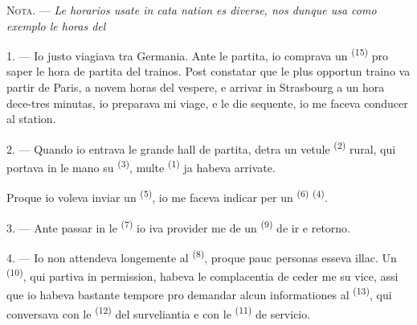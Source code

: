 
\VUsaut{4.0mm}
\VUsaut{2.4mm}
\VUsaut{3.4mm}
\textsc{Nota.} --- \textit{Le horarios usate in cata nation es diverse, nos dunque
usa como exemplo le horas del} 

1. --- Io justo viagiava tra Germania. Ante le partita, io comprava un
 \textsuperscript{(15)} pro saper le hora de partita del
trainos. Post constatar que le plus opportun traino va partir de Paris, a novem
horas del vespere, e arrivar in Strasbourg a un hora dece-tres minutas, io
preparava mi viage, e le die sequente, io me faceva conducer al station.

2. --- Quando io entrava le grande hall de partita, detra un vetule
 \textsuperscript{(2)} rural, qui portava in le mano su
 \textsuperscript{(3)}, multe 
\textsuperscript{(1)} ja habeva arrivate.

Proque io voleva inviar un 
\textsuperscript{(5)}, io me faceva indicar per un 
\textsuperscript{(6)}  \textsuperscript{(4)}.

3. --- Ante passar in le  \textsuperscript{(7)} io iva
provider me de un  \textsuperscript{(9)} de ir e retorno.

4. --- Io non attendeva longemente al  \textsuperscript{(8)},
proque pauc personas esseva illac. Un  \textsuperscript{(10)},
qui partiva in permission, habeva le complacentia de ceder me su vice, assi que
io habeva bastante tempore pro demandar alcun informationes al  \textsuperscript{(13)}, qui conversava con le 
\textsuperscript{(12)} del surveliantia e con le 
\textsuperscript{(11)} de servicio.

\VUsaut{3.0mm}

